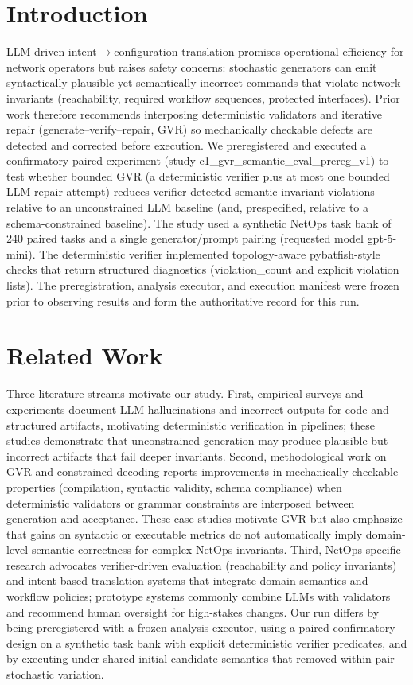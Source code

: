 \documentclass[conference]{IEEEtran}
\begin{document}
\section{Introduction}
LLM-driven intent\ensuremath{\rightarrow}configuration translation promises operational efficiency for network operators but raises safety concerns: stochastic generators can emit syntactically plausible yet semantically incorrect commands that violate network invariants (reachability, required workflow sequences, protected interfaces). Prior work therefore recommends interposing deterministic validators and iterative repair (generate--verify--repair, GVR) so mechanically checkable defects are detected and corrected before execution. We preregistered and executed a confirmatory paired experiment (study c1\_gvr\_semantic\_eval\_prereg\_v1) to test whether bounded GVR (a deterministic verifier plus at most one bounded LLM repair attempt) reduces verifier-detected semantic invariant violations relative to an unconstrained LLM baseline (and, prespecified, relative to a schema-constrained baseline). The study used a synthetic NetOps task bank of 240 paired tasks and a single generator/prompt pairing (requested model gpt-5-mini). The deterministic verifier implemented topology-aware pybatfish-style checks that return structured diagnostics (violation\_count and explicit violation lists). The preregistration, analysis executor, and execution manifest were frozen prior to observing results and form the authoritative record for this run.

\section{Related Work}
Three literature streams motivate our study. First, empirical surveys and experiments document LLM hallucinations and incorrect outputs for code and structured artifacts, motivating deterministic verification in pipelines; these studies demonstrate that unconstrained generation may produce plausible but incorrect artifacts that fail deeper invariants. Second, methodological work on GVR and constrained decoding reports improvements in mechanically checkable properties (compilation, syntactic validity, schema compliance) when deterministic validators or grammar constraints are interposed between generation and acceptance. These case studies motivate GVR but also emphasize that gains on syntactic or executable metrics do not automatically imply domain-level semantic correctness for complex NetOps invariants. Third, NetOps-specific research advocates verifier-driven evaluation (reachability and policy invariants) and intent-based translation systems that integrate domain semantics and workflow policies; prototype systems commonly combine LLMs with validators and recommend human oversight for high-stakes changes. Our run differs by being preregistered with a frozen analysis executor, using a paired confirmatory design on a synthetic task bank with explicit deterministic verifier predicates, and by executing under shared-initial-candidate semantics that removed within-pair stochastic variation.
\end{document}
